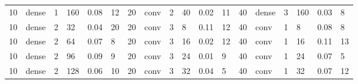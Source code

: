 \begin{table}[t!]
{\begin{tabular}{@{}llllll|llllll|llllll@{}}
10                              & dense                          & 1                              & 160                            & 0.08                             & 12                                & 20                              & conv                           & 2                              & 40                             & 0.02                           & 11                                & 40                              & dense                          & 3                              & 160                            & 0.03                           & 8                                \\
10                              & dense                          & 2                              & 32                             & 0.04                             & 20                                & 20                              & conv                           & 3                              & 8                              & 0.11                           & 12                                & 40                              & conv                           & 1                              & 8                              & 0.08                           & 8                                \\
10                              & dense                          & 2                              & 64                             & 0.07                             & 8                                 & 20                              & conv                           & 3                              & 16                             & 0.02                           & 12                                & 40                              & conv                           & 1                              & 16                             & 0.11                           & 13                               \\
10                              & dense                          & 2                              & 96                             & 0.09                             & 9                                 & 20                              & conv                           & 3                              & 24                             & 0.01                           & 9                                 & 40                              & conv                           & 1                              & 24                             & 0.07                           & 5                                \\
10                              & dense                          & 2                              & 128                            & 0.06                             & 10                                & 20                              & conv                           & 3                              & 32                             & 0.04                           & 5                                 & 40                              & conv                           & 1                              & 32                             & 0.07                           & 12                               \\

\end{tabular}}
\end{table}
